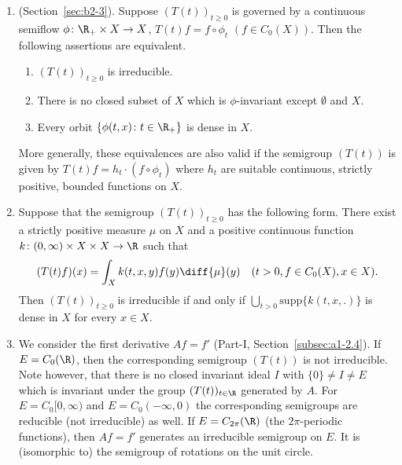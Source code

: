 \begin{examples}\label{ex:b3-3.4}
%
	
\begin{enumerate}[\upshape (i), wide, labelindent=.25em]
	\item 
	(\cf Section~\ref{sec:b2-3}). Suppose $(T(t))_{t\geq 0}$ is governed by a continuous semiflow
     $\phi \colon \R_{+} \times X \to X$, \ie $T(t)f = f\circ\phi_{t}$ $(f\in C_{0}(X))$.
	Then the following assertions are equivalent.
	\begin{enumerate}[\upshape (a)]
		\item 
		$(T(t))_{t\geq 0}$ is irreducible.
	
		\item 
		There is no closed subset of\/ $X$ which is $\phi$-invariant except $\emptyset$ and $X$.
	
		\item 
		Every orbit $\{\phi(t,x) \colon t \in \R_{+}\}$ is dense in $X$.
	\end{enumerate}
	More generally, these equivalences are also valid if the semigroup $(T(t))$ is given by $T(t)f = h_{t}\cdot(f\circ\phi_{t})$ where $h_{t}$ are suitable continuous, strictly positive, bounded functions on $X$.
	
	\item 
	Suppose that the semigroup $(T(t))_{t\geq 0}$ has the following form. 
    There exist a strictly positive measure $\mu$ on $X$ and a positive continuous function $k \colon (0,\infty) \times X \times X \to \R$ such that
	\begin{equation}\label{eq:b3-3.1}
		(T(t)f)(x) = \int_{X} k(t,x,y)f(y) \diff{\mu}(y) \quad (t > 0, f \in C_{0}(X), x \in X).		
	\end{equation}	
	Then $(T(t))_{t\geq 0}$ is irreducible if and only if\/ $\bigcup_{t>0}\text{supp}\{k(t,x,.)\}$ is dense in $X$ for every $x \in X$.
	
	\item 
	We consider the first derivative $Af = f'$ (\cf Part-I, Section~\ref{subsec:a1-2.4}). 
    If\/ $E = C_{0}(\R)$, then the corresponding semigroup $(T(t))$ is not irreducible.
	Note however, that there is no closed invariant ideal $I$ with $\{0\} \neq I \neq E$ which is invariant under the group $(T(t))_{t\in\R}$ generated by $A$.
	For $E = C_{0}[0,\infty)$ and $E = C_{0}(-\infty,0)$ the corresponding semigroups are reducible (\ie not irreducible) as well.
	If\/ $E = C_{2\pi}(\R)$ (\ie the $2\pi$-periodic functions), then $Af = f'$ generates an irreducible semigroup on $E$.
	It is (isomorphic to) the semigroup of rotations on the unit circle.
    

\end{enumerate}
\end{examples}

